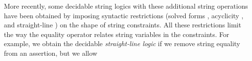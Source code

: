 More recently, some decidable string logics with these additional string 
operations have been obtained by imposing syntactic restrictions (solved forms
\cite{Vijay-length}, acyclicity \cite{Abdulla14,BFL13}, and straight-line
\cite{LB16}) on the shape of string constraints. All these 
restrictions limit the way the equality operator relates string variables in 
the constraints. For example, we obtain the decidable \emph{straight-line logic}
\cite{LB16} if we remove string equality from an assertion, but we allow


%
%



